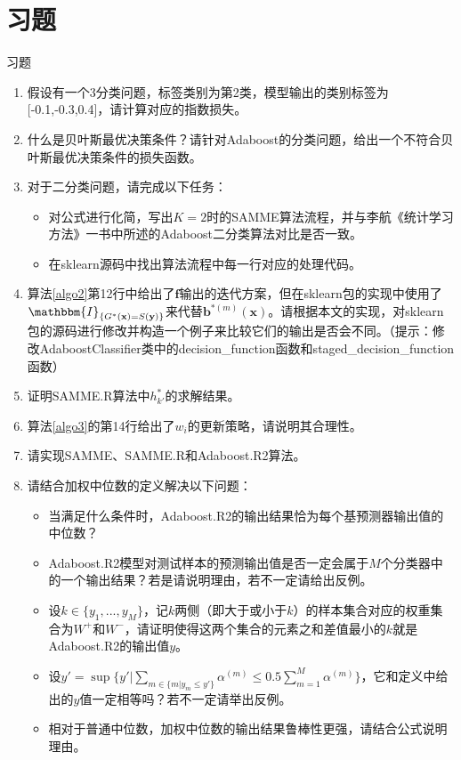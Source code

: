 \documentclass{ctexbeamer}        %
\begin{document}
\section{习题}
\begin{frame}[allowframebreaks]{习题}
\begin{enumerate}
\item 假设有一个3分类问题，标签类别为第2类，模型输出的类别标签为[-0.1,-0.3,0.4]，请计算对应的指数损失。
\item 什么是贝叶斯最优决策条件？请针对Adaboost的分类问题，给出一个不符合贝叶斯最优决策条件的损失函数。
\item 对于二分类问题，请完成以下任务：
\begin{itemize}
\item 对公式进行化简，写出$K=2$时的SAMME算法流程，并与李航《统计学习方法》一书中所述的Adaboost二分类算法对比是否一致。
\item 在sklearn源码中找出算法流程中每一行对应的处理代码。
\end{itemize}
\framebreak
\item 算法\ref{algo2}第12行中给出了$\mathbf{f}$输出的迭代方案，但在sklearn包的实现中使用了$\mathbbm{I}_{\{G^*(\mathbf{x})=S(\mathbf{y})\}}$来代替$\mathbf{b}^{*(m)}(\mathbf{x})$。请根据本文的实现，对sklearn包的源码进行修改并构造一个例子来比较它们的输出是否会不同。（提示：修改AdaboostClassifier类中的decision\_function函数和staged\_decision\_function函数）
\item 证明SAMME.R算法中$h^*_{k'}$的求解结果。
\item 算法\ref{algo3}的第14行给出了$w_i$的更新策略，请说明其合理性。
\item 请实现SAMME、SAMME.R和Adaboost.R2算法。
\framebreak
\item 请结合加权中位数的定义解决以下问题：
\begin{itemize}
\item 当满足什么条件时，Adaboost.R2的输出结果恰为每个基预测器输出值的中位数？
\item Adaboost.R2模型对测试样本的预测输出值是否一定会属于$M$个分类器中的一个输出结果？若是请说明理由，若不一定请给出反例。
\item 设$k\in \{y_1,...,y_M\}$，记$k$两侧（即大于或小于$k$）的样本集合对应的权重集合为$W^+$和$W^-$，请证明使得这两个集合的元素之和差值最小的$k$就是Adaboost.R2的输出值$y$。
\item 设$
y'=\sup \{ y'\big| \sum_{m\in \{m\vert y_m\leq y'\}}\alpha^{(m)} \leq 0.5 \sum_{m=1}^M\alpha^{(m)}\}
$，它和定义中给出的$y$值一定相等吗？若不一定请举出反例。
\item 相对于普通中位数，加权中位数的输出结果鲁棒性更强，请结合公式说明理由。
\end{itemize}
\end{enumerate}
\end{frame}
\end{document}
